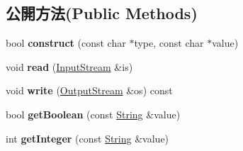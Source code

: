 \subsection*{公開方法(Public Methods)}
\begin{DoxyCompactItemize}
\item 
bool {\bfseries construct} (const char $\ast$type, const char $\ast$value)\hypertarget{class_magnum_1_1_render_states_block_add904a45d8fe2ff8b8b28cdd47a9ef1f}{}\label{class_magnum_1_1_render_states_block_add904a45d8fe2ff8b8b28cdd47a9ef1f}

\item 
void {\bfseries read} (\hyperlink{class_magnum_1_1_input_stream}{Input\+Stream} \&is)\hypertarget{class_magnum_1_1_render_states_block_ad932a134a13f754b6c42ac9ca3767a0c}{}\label{class_magnum_1_1_render_states_block_ad932a134a13f754b6c42ac9ca3767a0c}

\item 
void {\bfseries write} (\hyperlink{class_magnum_1_1_output_stream}{Output\+Stream} \&os) const \hypertarget{class_magnum_1_1_render_states_block_aca0ada59c389b983bcc3b083ad4a38bd}{}\label{class_magnum_1_1_render_states_block_aca0ada59c389b983bcc3b083ad4a38bd}

\item 
bool {\bfseries get\+Boolean} (const \hyperlink{class_magnum_1_1_string}{String} \&value)\hypertarget{class_magnum_1_1_render_states_block_a7e8a2347de2a7e667bea9c76b9ec9a07}{}\label{class_magnum_1_1_render_states_block_a7e8a2347de2a7e667bea9c76b9ec9a07}

\item 
int {\bfseries get\+Integer} (const \hyperlink{class_magnum_1_1_string}{String} \&value)\hypertarget{class_magnum_1_1_render_states_block_aa1b7df189aec1e9ebdc6265b1727cca3}{}\label{class_magnum_1_1_render_states_block_aa1b7df189aec1e9ebdc6265b1727cca3}

\end{DoxyCompactItemize}
